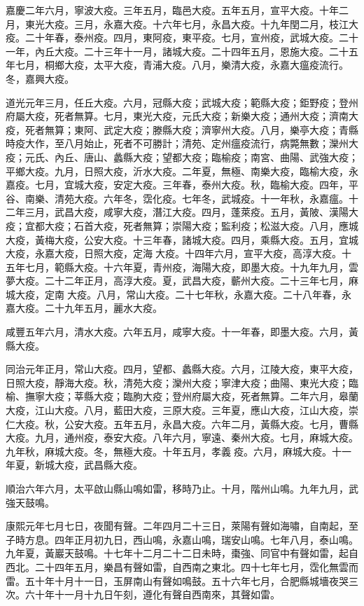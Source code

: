 \begin{pinyinscope}
嘉慶二年六月，寧波大疫。三年五月，臨邑大疫。五年五月，宣平大疫。十年二月，東光大疫。三月，永嘉大疫。十六年七月，永昌大疫。十九年閏二月，枝江大疫。二十年春，泰州疫。四月，東阿疫，東平疫。七月，宣州疫，武城大疫。二十一年，內丘大疫。二十三年十一月，諸城大疫。二十四年五月，恩施大疫。二十五年七月，桐鄉大疫，太平大疫，青浦大疫。八月，樂清大疫，永嘉大瘟疫流行。冬，嘉興大疫。

道光元年三月，任丘大疫。六月，冠縣大疫；武城大疫；範縣大疫；鉅野疫；登州府屬大疫，死者無算。七月，東光大疫，元氏大疫；新樂大疫；通州大疫；濟南大疫，死者無算；東阿、武定大疫；滕縣大疫；濟寧州大疫。八月，樂亭大疫；青縣時疫大作，至八月始止，死者不可勝計；清苑、定州瘟疫流行，病斃無數；灤州大疫；元氏、內丘、唐山、蠡縣大疫；望都大疫；臨榆疫；南宮、曲陽、武強大疫；平鄉大疫。九月，日照大疫，沂水大疫。二年夏，無極、南樂大疫，臨榆大疫，永嘉疫。七月，宜城大疫，安定大疫。三年春，泰州大疫。秋，臨榆大疫。四年，平谷、南樂、清苑大疫。六年冬，霑化疫。七年冬，武城疫。十一年秋，永嘉瘟。十二年三月，武昌大疫，咸寧大疫，潛江大疫。四月，蓬萊疫。五月，黃陂、漢陽大疫；宜都大疫；石首大疫，死者無算；崇陽大疫；監利疫；松滋大疫。八月，應城大疫，黃梅大疫，公安大疫。十三年春，諸城大疫。四月，乘縣大疫。五月，宜城大疫，永嘉大疫，日照大疫，定海大疫。十四年六月，宣平大疫，高淳大疫。十五年七月，範縣大疫。十六年夏，青州疫，海陽大疫，即墨大疫。十九年九月，雲夢大疫。二十二年正月，高淳大疫。夏，武昌大疫，蘄州大疫。二十三年七月，麻城大疫，定南大疫。八月，常山大疫。二十七年秋，永嘉大疫。二十八年春，永嘉大疫。二十九年五月，麗水大疫。

咸豐五年六月，清水大疫。六年五月，咸寧大疫。十一年春，即墨大疫。六月，黃縣大疫。

同治元年正月，常山大疫。四月，望都、蠡縣大疫。六月，江陵大疫，東平大疫，日照大疫，靜海大疫。秋，清苑大疫；灤州大疫；寧津大疫；曲陽、東光大疫；臨榆、撫寧大疫；莘縣大疫；臨朐大疫；登州府屬大疫，死者無算。二年六月，皋蘭大疫，江山大疫。八月，藍田大疫，三原大疫。三年夏，應山大疫，江山大疫，崇仁大疫。秋，公安大疫。五年五月，永昌大疫。六年二月，黃縣大疫。七月，曹縣大疫。九月，通州疫，泰安大疫。八年六月，寧遠、秦州大疫。七月，麻城大疫。九年秋，麻城大疫。冬，無極大疫。十年五月，孝義疫。六月，麻城大疫。十一年夏，新城大疫，武昌縣大疫。

順治六年六月，太平啟山縣山鳴如雷，移時乃止。十月，階州山鳴。九年九月，武強天鼓鳴。

康熙元年七月七日，夜聞有聲。二年四月二十三日，萊陽有聲如海嘯，自南起，至子時方息。四年正月初九日，西山鳴，永嘉山鳴，瑞安山鳴。七年八月，泰山鳴。九年夏，黃巖天鼓鳴。十七年十二月二十二日未時，棗強、同官中有聲如雷，起自西北。二十四年五月，樂昌有聲如雷，自西南之東北。四十七年七月，霑化無雲而雷。五十年十月十一日，玉屏南山有聲如鳴鼓。五十六年七月，合肥縣城墻夜哭三次。六十年十一月十九日午刻，遵化有聲自西南來，其聲如雷。


\end{pinyinscope}
